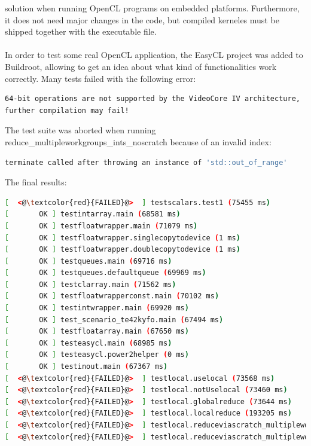 \documentclass[12pt,a4paper,oneside]{article}
\begin{document}
solution when running OpenCL programs on embedded platforms. Furthermore, it does
not need major changes in the code, but compiled kerneles must be shipped together
with the executable file.\\\\
In order to test some real OpenCL application, the EasyCL project was added to
Buildroot, allowing to get an idea about what kind of functionalities work
correctly. Many tests failed with the following error:
\begin{lstlisting}[language=sh,caption={},captionpos=b,keywords={}]
64-bit operations are not supported by the VideoCore IV architecture,
further compilation may fail!
\end{lstlisting}
The test suite was aborted when running {\selectfont reduce\_multipleworkgroups\_ints\_noscratch}
because of an invalid index:
\begin{lstlisting}[language=sh,caption={},captionpos=b,keywords={}]
terminate called after throwing an instance of 'std::out_of_range'
\end{lstlisting}
The final results:
\begin{lstlisting}[language=sh,caption={EasyCL tests},captionpos=b,keywords={OK}]
[  <@\textcolor{red}{FAILED}@>  ] testscalars.test1 (75455 ms)
[       OK ] testintarray.main (68581 ms)
[       OK ] testfloatwrapper.main (71079 ms)
[       OK ] testfloatwrapper.singlecopytodevice (1 ms)
[       OK ] testfloatwrapper.doublecopytodevice (1 ms)
[       OK ] testqueues.main (69716 ms)
[       OK ] testqueues.defaultqueue (69969 ms)
[       OK ] testclarray.main (71562 ms)
[       OK ] testfloatwrapperconst.main (70102 ms)
[       OK ] testintwrapper.main (69920 ms)
[       OK ] test_scenario_te42kyfo.main (67494 ms)
[       OK ] testfloatarray.main (67650 ms)
[       OK ] testeasycl.main (68985 ms)
[       OK ] testeasycl.power2helper (0 ms)
[       OK ] testinout.main (67367 ms)
[  <@\textcolor{red}{FAILED}@>  ] testlocal.uselocal (73568 ms)
[  <@\textcolor{red}{FAILED}@>  ] testlocal.notUselocal (73460 ms)
[  <@\textcolor{red}{FAILED}@>  ] testlocal.globalreduce (73644 ms)
[  <@\textcolor{red}{FAILED}@>  ] testlocal.localreduce (193205 ms)
[  <@\textcolor{red}{FAILED}@>  ] testlocal.reduceviascratch_multipleworkgroups (192997 ms)
[  <@\textcolor{red}{FAILED}@>  ] testlocal.reduceviascratch_multipleworkgroups_ints (194560 ms)
\end{lstlisting}
\end{document}
